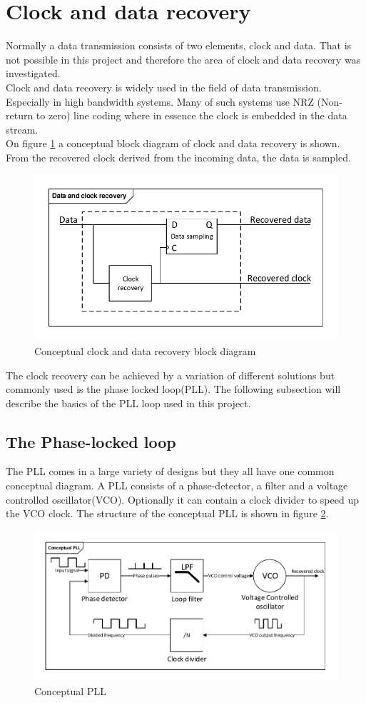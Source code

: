 \section{Clock and data recovery}
Normally a data transmission consists of two elements, clock and data. That is not possible in this project and therefore the area of clock and data recovery was investigated.\\
Clock and data recovery is widely used in the field of data transmission. Especially in high bandwidth systems. Many of such systems use NRZ (Non-return to zero) line coding where in essence the clock is embedded in the data stream.\\
On figure \ref{fig:CDR} a conceptual block diagram of clock and data recovery is shown. From the recovered clock derived from the incoming data, the data is sampled.
\begin{figure}[hbpt]
	\centering
	\includegraphics[width=.8\textwidth]{billeder/10technologystudies/CDR}
	\caption{Conceptual clock and data recovery block diagram}
	\label{fig:CDR}
\end{figure}
The clock recovery can be achieved by a variation of different solutions but commonly used is the phase locked loop(PLL). The following subsection will describe the basics of the PLL loop used in this project.
\subsection{The Phase-locked loop}
The PLL comes in a large variety of designs but they all have one common conceptual diagram. A PLL consists of a phase-detector, a filter and a voltage controlled oscillator(VCO). Optionally it can contain a clock divider to speed up the VCO clock. The structure of the conceptual PLL is shown in figure \ref{fig:conceptualpll}.
\begin{figure}[H]
	\centering
	\includegraphics[width=.9\textwidth]{billeder/10technologystudies/conceptualpll}
	\caption{Conceptual PLL}
	\label{fig:conceptualpll}
\end{figure}
